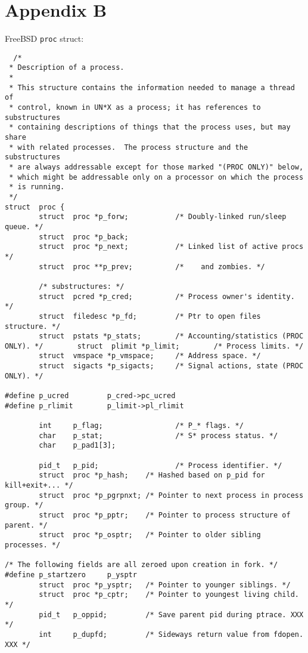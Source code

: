 \section{Appendix B}
FreeBSD \texttt{proc} struct: \cite{freebsdstruct2016}
\begin{lstlisting}
  /*
 * Description of a process.
 *
 * This structure contains the information needed to manage a thread of
 * control, known in UN*X as a process; it has references to substructures
 * containing descriptions of things that the process uses, but may share
 * with related processes.  The process structure and the substructures
 * are always addressable except for those marked "(PROC ONLY)" below,
 * which might be addressable only on a processor on which the process
 * is running.
 */
struct  proc {
        struct  proc *p_forw;           /* Doubly-linked run/sleep queue. */
        struct  proc *p_back;
        struct  proc *p_next;           /* Linked list of active procs */
        struct  proc **p_prev;          /*    and zombies. */

        /* substructures: */
        struct  pcred *p_cred;          /* Process owner's identity. */
        struct  filedesc *p_fd;         /* Ptr to open files structure. */
        struct  pstats *p_stats;        /* Accounting/statistics (PROC ONLY). */        struct  plimit *p_limit;        /* Process limits. */
        struct  vmspace *p_vmspace;     /* Address space. */
        struct  sigacts *p_sigacts;     /* Signal actions, state (PROC ONLY). */

#define p_ucred         p_cred->pc_ucred
#define p_rlimit        p_limit->pl_rlimit

        int     p_flag;                 /* P_* flags. */
        char    p_stat;                 /* S* process status. */
        char    p_pad1[3];

        pid_t   p_pid;                  /* Process identifier. */
        struct  proc *p_hash;    /* Hashed based on p_pid for kill+exit+... */
        struct  proc *p_pgrpnxt; /* Pointer to next process in process group. */
        struct  proc *p_pptr;    /* Pointer to process structure of parent. */
        struct  proc *p_osptr;   /* Pointer to older sibling processes. */

/* The following fields are all zeroed upon creation in fork. */
#define p_startzero     p_ysptr
        struct  proc *p_ysptr;   /* Pointer to younger siblings. */
        struct  proc *p_cptr;    /* Pointer to youngest living child. */
        pid_t   p_oppid;         /* Save parent pid during ptrace. XXX */
        int     p_dupfd;         /* Sideways return value from fdopen. XXX */


\end{lstlisting}

